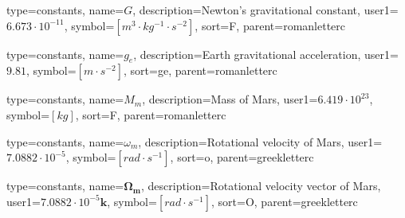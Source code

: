 {
type=constants, %
name={\ensuremath{G}}, %
description={Newton's gravitational constant}, %
user1={$6.673\cdot10^{-11}$}, %
symbol={$\left[m^3\cdot kg^{-1} \cdot s^{-2}\right]$}, %
sort=F, %
parent=romanletterc %
}

{
	type=constants, %
	name={\ensuremath{g_{e}}}, %
	description={Earth gravitational acceleration}, %
	user1={$9.81$}, %
	symbol={$\left[m\cdot s^{-2} \right]$}, %
	sort=ge, %
	parent=romanletterc %
}

{
type=constants, %
name={\ensuremath{M_{m}}}, %
description={Mass of Mars}, %
user1={$6.419\cdot10^{23}$}, %
symbol={$\left[kg\right]$}, %
sort=F, %
parent=romanletterc %
}

{
type=constants, %
name={\ensuremath{\omega_{m}}}, %
description={Rotational velocity of Mars}, %
user1={$7.0882\cdot10^{-5}$}, %
symbol={$\left[rad\cdot s^{-1}\right]$}, %
sort=o, %
parent=greekletterc %
}

{
type=constants, %
name={\ensuremath{\mathbf{\Omega_{m}}}}, %
description={Rotational velocity vector of Mars}, %
user1={$7.0882\cdot10^{-5}\mathbf{k}$}, %
symbol={$\left[rad\cdot s^{-1}\right]$}, %
sort=O, %
parent=greekletterc %
}

